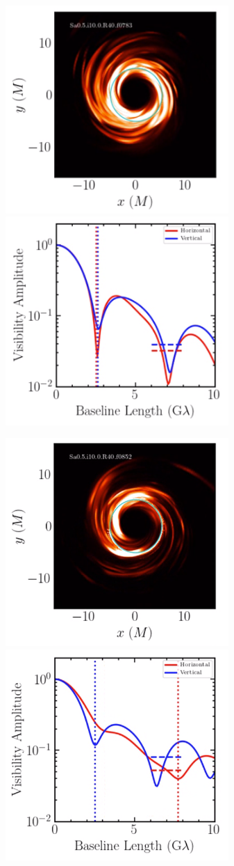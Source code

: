 \documentclass[twocolumn,tighten,dvipsnames,linenumbers]{aastex63}
\begin{document}
\begin{figure} 
 \centerline{
    \includegraphics[width=8.5cm] {783_image}
     \includegraphics[width=8.5cm] {783_va}}
 \centerline{
    \includegraphics[width=8.5cm] {852_image}
    \includegraphics[width=8.5cm] {852_va}}

\end{figure}
\end{document}

